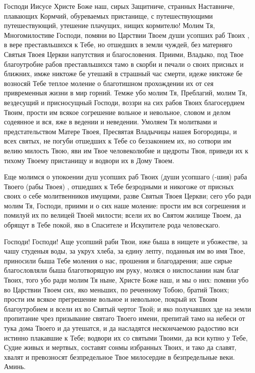 \mychapterending

\begin{mymulticols}


Господи Иисусе Христе Боже наш, сирых Защитниче, странных Наставниче, плавающих Кормчий, обуреваемых пристанище, с путешествующими путешествующий, утешение плачущих, нищих кормителю! Молим Тя, Многомилостиве Господи, помяни во Царствии Твоем души усопших раб Твоих , в вере преставльшихся к Тебе, но отшедших в земли чуждей, без матерняго Святыя Твоея Церкви напутствия и благословения. Приими, Владыко, под Твое благоутробие рабов преставльшихся тамо в скорби и печали о своих присных и ближних, имже никтоже бе утешаяй в страшный час смерти, идеже никтоже бе возносяй Тебе теплое моление о благотишном прохождении их от сея привременныя жизни в мир горний. Темже убо молим Тя, Преблагий, молим Тя, вездесущий и присносущный Господи, воззри на сих рабов Твоих благосердием Твоим, прости им всякое согрешение вольное и невольное, словом и делом содеянное и вся, яже в ведении и неведении. Умоляем Тя молитвами и предстательством Матере Твоея, Пресвятая Владычицы нашея Богородицы, и всех святых, не погуби отшедших к Тебе со беззаконием их, но сотвори им велию милость Твою, яви им Твое человеколюбие и щедроты Твоя, приведи их к тихому Твоему пристанищу и водвори их в Дому Твоем. 

Еще молимся о упокоении душ усопших раб Твоих (души усопшаго (-шия) раба Твоего (рабы Твоея) , отшедших к Тебе безродными и никогоже от присных своих о себе молитвенников имущими, разве Святыя Твоея Церкви; сего убо ради молим Тя, Господи, приими и о сих наше моление: прости им вся согрешения и помилуй их по велицей Твоей милости; всели их во Святом жилище Твоем, да обрящут в Тебе покой, яко в Спасителе и Искупителе рода человескаго. 

Господи! Господи! Аще усопший раби Твои, иже быша в нищете и убожестве, за чашу студеныя воды, за укрух хлеба, за едину лепту, поданныя им во имя Твое, приносили быша Тебе моления о нас, прошения и благодарения; аше сирые благословляли быша благотворящую им руку, моляся о ниспослании нам благ Твоих, того убо ради молим Тя ныне, Христе Боже наш, и мы о них: помяни убо во Царствии Твоем сих, яко меньших, по реченному Тобою, братий Твоих; прости им всякое прегрешение вольное и невольное, покрый их Твоим благоутробием и всели их во Святый чертог Твой; и яко получавших зде на земли пропитание чрез призывание святаго Твоего имени, препитай тамо на небеси от тука дома Твоего и да утешатся, и да насладятся нескончаемою радостию вси истинно плакавшие к Тебе; водвори их со святыми Твоими, да вси купно у Тебе, Судие живых и мертвых, составят сонмы избранных Твоих, и тако да славят, хвалят и превозносят безпредельное Твое милосердие в безпредельные веки. Аминь. 

\end{mymulticols}

